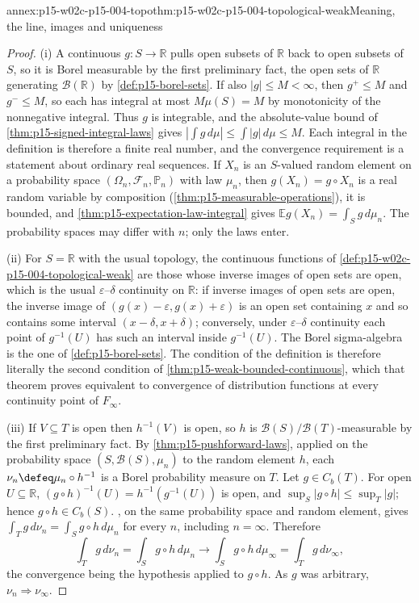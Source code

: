 \begin{annexitem}{annex:p15-w02c-p15-004-topo}{thm:p15-w02c-p15-004-topological-weak}{Meaning, the line, images and uniqueness}
\begin{proof}
(i) A continuous \(g:S\to\mathbb R\) pulls open subsets of
\(\mathbb R\) back to open subsets of \(S\), so it is Borel measurable
by the first preliminary fact, the open sets of \(\mathbb R\) generating
\(\mathcal B(\mathbb R)\) by \cref{def:p15-borel-sets}. If also
\(|g|\leq M<\infty\), then \(g^+\leq M\) and \(g^-\leq M\), so each has
integral at most \(M\mu(S)=M\) by monotonicity of the nonnegative
integral. Thus \(g\) is integrable, and the absolute-value bound of
\cref{thm:p15-signed-integral-laws} gives
\(|\int g\,d\mu|\leq\int|g|\,d\mu\leq M\). Each integral in the
definition is therefore a finite real number, and the convergence
requirement is a statement about ordinary real sequences.
If \(X_n\) is an \(S\)-valued random element on a probability space
\((\Omega_n,\mathcal F_n,\mathbb P_n)\) with law \(\mu_n\), then
\(g(X_n)=g\circ X_n\) is a real random variable by composition
(\cref{thm:p15-measurable-operations}), it is bounded, and
\cref{thm:p15-expectation-law-integral} gives
\(\mathbb E g(X_n)=\int_S g\,d\mu_n\). The probability spaces may differ
with \(n\); only the laws enter.

(ii) For \(S=\mathbb R\) with the usual topology, the continuous
functions of \cref{def:p15-w02c-p15-004-topological-weak} are those
whose inverse images of open sets are open, which is the usual
\(\varepsilon\)--\(\delta\) continuity on \(\mathbb R\): if inverse
images of open sets are open, the inverse image of
\((g(x)-\varepsilon,g(x)+\varepsilon)\) is an open set containing
\(x\) and so contains some interval \((x-\delta,x+\delta)\); conversely,
under \(\varepsilon\)--\(\delta\) continuity each point of
\(g^{-1}(U)\) has such an interval inside \(g^{-1}(U)\). The Borel
sigma-algebra is the one of \cref{def:p15-borel-sets}. The condition of
the definition is therefore literally the second condition of
\cref{thm:p15-weak-bounded-continuous}, which that theorem proves
equivalent to convergence of distribution functions at every continuity
point of \(F_\infty\).

(iii) If \(V\subseteq T\) is open then \(h^{-1}(V)\) is open, so
\(h\) is \(\mathcal B(S)/\mathcal B(T)\)-measurable by the first
preliminary fact. By \cref{thm:p15-pushforward-laws}, applied on the
probability space \((S,\mathcal B(S),\mu_n)\) to the random element
\(h\), each \(\nu_n\defeq\mu_n\circ h^{-1}\) is a Borel probability
measure on \(T\). Let \(g\in C_b(T)\). For open \(U\subseteq\mathbb R\),
\((g\circ h)^{-1}(U)=h^{-1}(g^{-1}(U))\) is open, and
\(\sup_S|g\circ h|\leq\sup_T|g|\); hence \(g\circ h\in C_b(S)\).
, on the same probability space
and random element, gives \(\int_T g\,d\nu_n=\int_S g\circ h\,d\mu_n\)
for every \(n\), including \(n=\infty\). Therefore
\[
 \int_T g\,d\nu_n=\int_S g\circ h\,d\mu_n
   \longrightarrow\int_S g\circ h\,d\mu_\infty=\int_T g\,d\nu_\infty,
\]
the convergence being the hypothesis applied to \(g\circ h\). As \(g\)
was arbitrary, \(\nu_n\Rightarrow\nu_\infty\).


\end{proof}
\end{annexitem}
